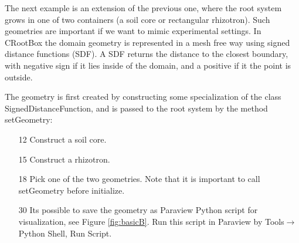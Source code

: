 \documentclass[a4paper]{article}
\begin{document}
The next example is an extension of the previous one, where the root system grows in one of two containers (a soil core or rectangular rhizotron).
Such geometries are important if we want to mimic experimental settings. In CRootBox the domain geometry is represented in a mesh free way using signed distance functions (SDF).
A SDF returns the distance to the closest boundary, with negative sign if it lies inside of the domain, and a positive if it the point is outside.



The geometry is first created by constructing some specialization of the class SignedDistanceFunction, and is passed to the root system by the method setGeometry: 
\begin{itemize}
 \item[12] Construct a soil core. 
 \item[15] Construct a rhizotron.
 \item[18] Pick one of the two geometries. Note that it is important to call setGeometry before initialize.
 \item[30] Its possible to save the geometry as Paraview Python script for visualization, see Figure \ref{fig:basicB}. Run this script in Paraview by Tools$\rightarrow$Python Shell, Run Script.
\end{itemize}
\end{document}

